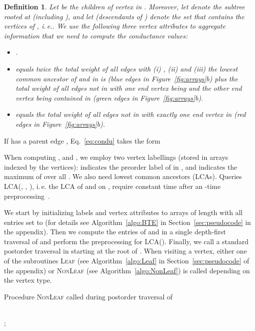 \documentclass[pdftex]{llncs}
\newcommand{\ie}{i.\,e.\xspace}
\newtheorem{consDefinition}[example]{Definition}
\numberwithin{equation}{section}
\numberwithin{example}{section}
\numberwithin{table}{section}
\begin{document}
\begin{consDefinition} \label{def:attributes}
Let  be the children of vertex  in .  Moreover, let
 denote the subtree rooted at  (including ), and let 
(\emph{descendants of }) denote the set that contains the vertices
of , \ie . We use the following three vertex
attributes to aggregate information that we need to compute the
conductance values:
\begin{itemize}[noitemsep,nolistsep]
  \item .
  \item  equals twice the total weight of all edges  with (i) , (ii)  and (iii)
    the lowest common ancestor of  and  in  is  ({\color{blue}blue}
    edges in Figure~\ref{fig:arrays}b) plus the total weight of all
    edges not in  with one end vertex being  and the other end
    vertex being contained in  ({\color{ForestGreen}green} edges in
    Figure~\ref{fig:arrays}b).
  \item  equals the total weight of all edges not
    in  with exactly one end vertex in  ({\color{red}red} edges in
    Figure~\ref{fig:arrays}b).
\end{itemize}
\end{consDefinition}
If  has a parent edge , Eq.~\ref{eq:condu} takes the form



When computing ,  and , we
employ two vertex labellings (stored in arrays indexed by the
vertices):  indicates the preorder label of  in , and
 indicates the maximum of  over all
. We also need lowest common ancestors (LCAs). Queries
\textsc{LCA}(, , ), \ie the LCA of  and  on ,
require constant time after an -time
preprocessing~\cite{Bender:2000:LPR:646388.690192}.


We start by initializing labels and vertex attributes to arrays of
length  with all entries set to  (for details see
Algorithm~\ref{algo:BTE} in Section~\ref{sec:pseudocode} in the
appendix). Then we compute the entries of  and
 in a single depth-first traversal of  and
perform the preprocessing for \textsc{LCA}(). Finally, we call a standard postorder traversal in 
starting at the root of . When visiting a vertex, either one of the
subroutines \textsc{Leaf} (see Algorithm~\ref{algo:Leaf} in
Section~\ref{sec:pseudocode} of the appendix) or
\textsc{NonLeaf} (see Algorithm~\ref{algo:NonLeaf}) is called
depending on the vertex type.


\begin{algorithm}[tbp]
\caption{Procedure \textsc{NonLeaf} called during postorder traversal of }
\label{algo:NonLeaf}
\begin{algorithmic}[1]
\State 

\ForAll{}
  \If{}
      \State 
      \State 
    \Else
      \State 
    \EndIf
  \Else
  \If{}\\ 
    \State 
    \State 
    \State 
  \EndIf
\EndIf
\EndFor
\State  \State
;
\If{} \State

\EndIf
\end{algorithmic}
\end{algorithm}
\end{document}
